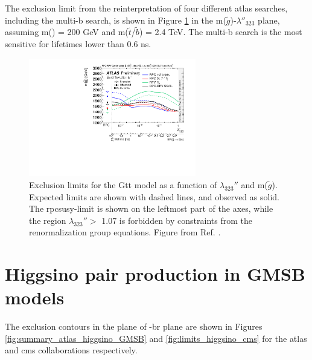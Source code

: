 The exclusion limit from the reinterpretation of four different \gls{atlas} searches, including the multi-b search, 
is shown in Figure \ref{fig:rpv_Gtt} in the m($\tilde{g}$)-$\lambda''_{323}$ plane, assuming m(\ninoone) = 200 GeV and  
m($\tilde{t}$/$\tilde{b}$) = 2.4 TeV. 
The multi-b search is the most sensitive for \ninoone lifetimes lower than 0.6 ns. 

\begin{figure}[htbp]
	\centering
	\includegraphics[width=0.65\textwidth]{figures/rpv/fig_04.pdf}
	\caption{	
	Exclusion limits for the Gtt model as a function of $\lambda_{323}''$ and m($\tilde{g}$). Expected limits are shown with dashed lines, and observed as solid. The \gls{rpcsusy}-limit is shown on the leftmost part of the axes, while the region $\lambda_{323}''>$ 1.07 is forbidden by constraints from the renormalization group equations. Figure from Ref. \cite{ATLAS-CONF-2018-003}.
	} 
	\label{fig:rpv_Gtt}
\end{figure}

\FloatBarrier

\section{Higgsino pair production in GMSB models}

The exclusion contours in the plane of \mhino-\gls{br} plane are shown in Figures \ref{fig:summary_atlas_higgsino_GMSB} 
and \ref{fig:limits_higgsino_cms} for the \gls{atlas} and \gls{cms} collaborations respectively.

